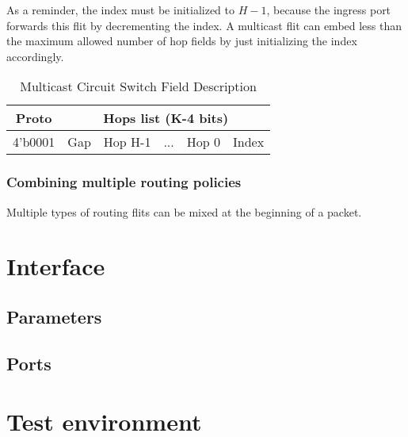 As a reminder, the index must be initialized to $H-1$, because the ingress port forwards this flit by decrementing the
index. A multicast flit can embed less than the maximum allowed number of hop fields by just initializing the index
accordingly.

\begin{table}[h]
  \centering
  \begin{tabular}{c | c | c | c | c | c}
    \toprule
    \hline
    \textbf{Proto} & \multicolumn{5}{c}{\textbf{Hops list (K-4 bits)}} \\
    \hline\hline
    4'b0001 & Gap & Hop H-1 & ... & Hop 0 & Index \\
    \hline
    \bottomrule
  \end{tabular}
  \caption{\label{multicast_circuit_switch_field} Multicast Circuit Switch Field Description}
\end{table}

\subsubsection{Combining multiple routing policies}

Multiple types of routing flits can be mixed at the beginning of a packet.

\section{Interface}

\subsection{Parameters}

\subsection{Ports}

\section{Test environment}
